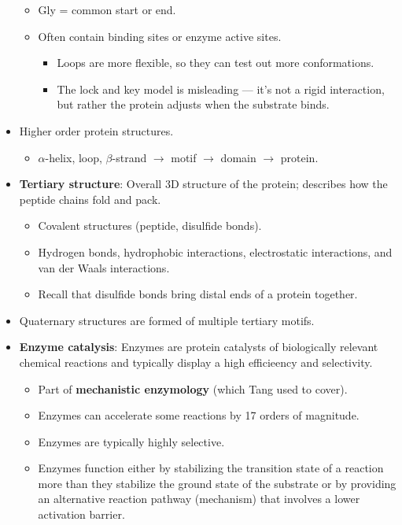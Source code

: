 \documentclass[../notes.tex]{subfiles}
\begin{document}
\begin{itemize}
\begin{itemize}
        \item Gly = common start or end.
        \item Often contain binding sites or enzyme active sites.
        \begin{itemize}
            \item Loops are more flexible, so they can test out more conformations.
            \item The lock and key model is misleading --- it's not a rigid interaction, but rather the protein adjusts when the substrate binds.
        \end{itemize}
    \end{itemize}
    \item Higher order protein structures.
    \begin{itemize}
        \item $\alpha$-helix, loop, $\beta$-strand $\to$ motif $\to$ domain $\to$ protein.
    \end{itemize}
    \item \textbf{Tertiary structure}: Overall 3D structure of the protein; describes how the peptide chains fold and pack.
    \begin{itemize}
        \item Covalent structures (peptide, disulfide bonds).
        \item Hydrogen bonds, hydrophobic interactions, electrostatic interactions, and van der Waals interactions.
        \item Recall that disulfide bonds bring distal ends of a protein together.
    \end{itemize}
    \item Quaternary structures are formed of multiple tertiary motifs.
    \item \textbf{Enzyme catalysis}: Enzymes are protein catalysts of biologically relevant chemical reactions and typically display a high efficieency and selectivity.
    \begin{itemize}
        \item Part of \textbf{mechanistic enzymology} (which Tang used to cover).
        \item Enzymes can accelerate some reactions by 17 orders of magnitude.
        \item Enzymes are typically highly selective.
        \item Enzymes function either by stabilizing the transition state of a reaction more than they stabilize the ground state of the substrate or by providing an alternative reaction pathway (mechanism) that involves a lower activation barrier.

\end{itemize}
\end{itemize}
\end{document}
